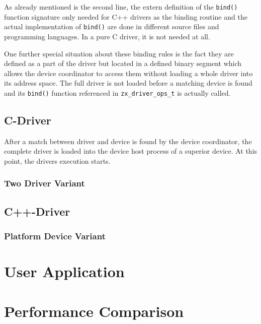 As already mentioned is the second line, the extern definition of the \texttt{bind()} function signature only needed for C++ drivers as the binding routine and the actual implementation of  \texttt{bind()} are done in different source files and programming languages.
In a pure C driver, it is not needed at all.

One further special situation about these binding rules is the fact they are defined as a part of the driver but located in a defined binary segment which allows the device coordinator to access them without loading a whole driver into its address space.
The full driver is not loaded before a matching device is found and its \texttt{bind()} function referenced in \texttt{zx_driver_ops_t} is actually called.

\subsection{C-Driver}
After a match between driver and device is found by the device coordinator, the complete driver is loaded into the device host process of a superior device.
At this point, the drivers execution starts. 

\subsubsection{Two Driver Variant} 

\subsection{C++-Driver}
\subsubsection{Platform Device Variant}
 


\section{User Application}

\section{Performance Comparison}

